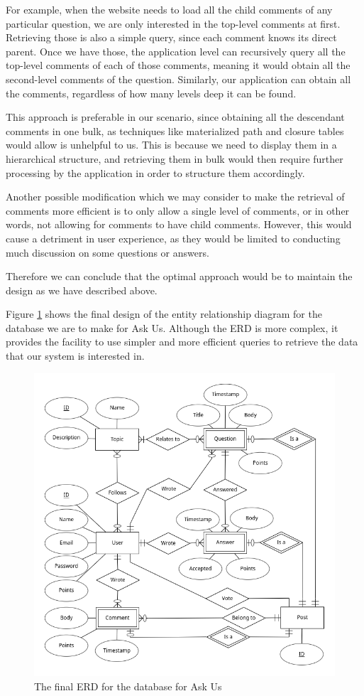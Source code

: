 For example, when the website needs to load all the child comments of any particular question, we are only interested in the top-level comments at first. Retrieving those is also a simple query, since each comment knows its direct parent. Once we have those, the application level can recursively query all the top-level comments of each of those comments, meaning it would obtain all the second-level comments of the question. Similarly, our application can obtain all the comments, regardless of how many levels deep it can be found.

This approach is preferable in our scenario, since obtaining all the descendant comments in one bulk, as techniques like materialized path and closure tables would allow is unhelpful to us. This is because we need to display them in a hierarchical structure, and retrieving them in bulk would then require further processing by the application in order to structure them accordingly.

Another possible modification which we may consider to make the retrieval of comments more efficient is to only allow a single level of comments, or in other words, not allowing for comments to have child comments. However, this would cause a detriment in user experience, as they would be limited to conducting much discussion on some questions or answers.

Therefore we can conclude that the optimal approach would be to maintain the design as we have described above.

Figure \ref{erd2} shows the final design of the entity relationship diagram for the database we are to make for Ask Us. Although the ERD is more complex, it provides the facility to use simpler and more efficient queries to retrieve the data that our system is interested in.

\begin{figure}[htbp]
	\centering
	\includegraphics[width=\linewidth]{../../ERD/erd.png}
	\caption{The final ERD for the database for Ask Us}
	\label{erd2}
\end{figure}